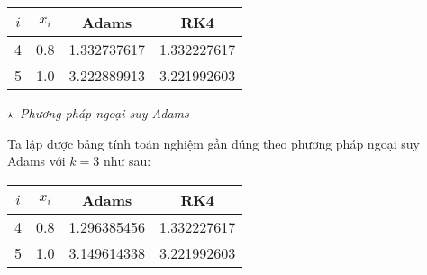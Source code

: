 \begin{longtable}{|c|c|c|c|}\hline
$i$&$x_i$&Adams&RK4\\ \hline
\endhead
4 &0.8 &1.332737617 &1.332227617\\ \hline
5 &1.0 &3.222889913 &3.221992603\\ \hline
\end{longtable}

$\star$~\textit{Phương pháp ngoại suy Adams}\par
Ta lập được bảng tính toán nghiệm gần đúng theo phương pháp ngoại suy Adams với $k=3$ như sau:

\begin{longtable}{|c|c|c|c|}\hline
$i$&$x_i$&Adams&RK4\\ \hline
\endhead
4 &0.8 &1.296385456 &1.332227617 \\ \hline
5 &1.0 &3.149614338 &3.221992603 \\ \hline\end{longtable}